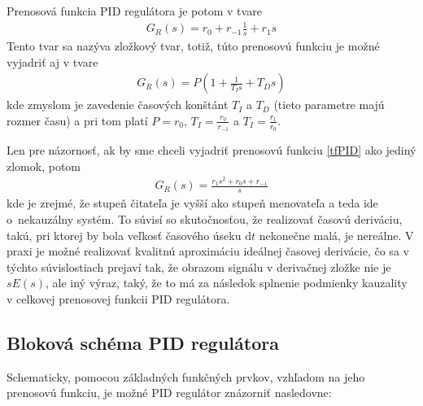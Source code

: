\documentclass[a4paper, 10pt, ]{article}
\begin{document}
Prenosová funkcia PID regulátora je potom v tvare
\begin{align} \label{tfPID}
    G_R(s) = r_0  + r_{-1}  \frac{1}{s}  + r_1  s
\end{align}
Tento tvar sa nazýva zložkový tvar, totiž, túto prenosovú funkciu je možné vyjadriť aj v tvare
\begin{align}
    G_R(s) = P \left( 1 +  \frac{1}{T_I s}  +  T_D  s \right)
\end{align}
kde zmyslom je zavedenie časových konštánt $T_I$ a $T_D$ (tieto parametre majú rozmer času) a pri tom platí $P = r_0$, $T_I = \frac{r_0}{r_{-1}}$ a $T_I = \frac{r_1}{r_0}$.

Len pre názornosť, ak by sme chceli vyjadriť prenosovú funkciu \eqref{tfPID} ako jediný zlomok, potom
\begin{align} \label{tfPID2}
    G_R(s) =  \frac{ r_1 s^2 + r_0 s + r_{-1} }{s}
\end{align}
kde je zrejmé, že stupeň čitateľa je vyšší ako stupeň menovateľa a teda ide o~nekauzálny systém. To súvisí so skutočnosťou, že realizovať časovú deriváciu, takú, pri ktorej by bola veľkosť časového úseku $\text{d}t$ nekonečne malá, je nereálne. V praxi je možné realizovať kvalitnú aproximáciu ideálnej časovej derivácie, čo sa v týchto súvislostiach prejaví tak, že obrazom signálu v derivačnej zložke nie je $sE(s)$, ale iný výraz, taký, že to má za následok splnenie podmienky kauzality v celkovej prenosovej funkcii PID regulátora.




\subsection{Bloková schéma PID regulátora}

Schematicky, pomocou základných funkčných prvkov, vzhľadom na jeho prenosovú funkciu, je možné PID regulátor znázorniť nasledovne:

\begin{center}

    \vspace{-1mm}


    \vspace{-3mm}

	\label{PID_blokSch.pdf}

    \vspace{-1mm}

\end{center}
\end{document}

